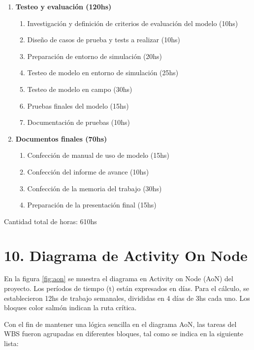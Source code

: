 \documentclass[
11pt, %
codirector, %
]{charter}
\begin{document}
\begin{enumerate}
\item \textbf{Testeo y evaluación (120hs)}
	\begin{enumerate}
		\item Investigación y definición de criterios de evaluación del modelo (10hs)
		\item Diseño de casos de prueba y tests a realizar (10hs)
		\item Preparación de entorno de simulación (20hs)
		\item Testeo de modelo en entorno de simulación (25hs)
		\item Testeo de modelo en campo (30hs)
		\item Pruebas finales del modelo (15hs)
		\item Documentación de pruebas (10hs)
	\end{enumerate}

\item \textbf{Documentos finales (70hs)}
	\begin{enumerate}
		\item Confección de manual de uso de modelo (15hs)
		\item Confección del informe de avance (10hs)
		\item Confección de la memoria del trabajo (30hs)
		\item Preparación de la presentación final (15hs)
	\end{enumerate}
	
\end{enumerate}


Cantidad total de horas: 610hs


\section{10. Diagrama de Activity On Node}
\label{sec:AoN}

En la figura \ref{fig:aon} se muestra el diagrama en Activity on Node (AoN) del proyecto. Los períodos de tiempo (t) están expresados en días. Para el cálculo, se establecieron 12hs de trabajo semanales, divididas en 4 días de 3hs cada uno. Los bloques color salmón indican la ruta crítica.

Con el fin de mantener una lógica sencilla en el diagrama AoN, las tareas del WBS fueron agrupadas en diferentes bloques, tal como se indica en la siguiente lista:
\end{document}
